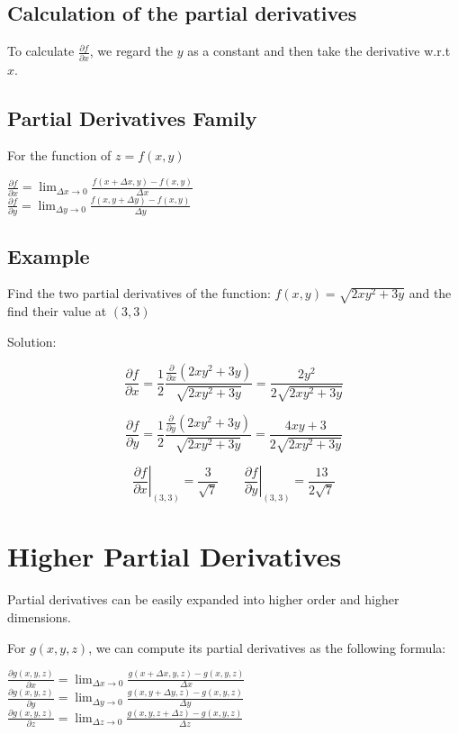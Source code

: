 \subsection{Calculation of the partial derivatives}
To calculate $\frac{\partial f}{\partial x}$, we regard the $y$ as a constant and then take the derivative w.r.t $x$.
\subsection{Partial Derivatives Family}
For the function of $z=f(x,y)$
\begin{center}
$\frac{\partial f}{\partial x}=\displaystyle\lim_{\Delta x \to 0}\frac{f(x+\Delta x,y)-f(x,y)}{\Delta x}$\\
$\frac{\partial f}{\partial y}=\displaystyle\lim_{\Delta y \to 0}\frac{f(x,y+\Delta y)-f(x,y)}{\Delta y}$
\end{center}

\subsection{Example}
Find the two partial derivatives of the function: $f(x,y)=\sqrt{2xy^2+3y}$ and the find their value at $(3,3)$

Solution:

\[\frac{\partial f}{\partial x}=\frac{1}{2}\frac{\frac{\partial}{\partial x}(2xy^2+3y)}{\sqrt{2xy^2+3y}}=\frac{2y^2}{2\sqrt{2xy^2+3y}}\]

\[\frac{\partial f}{\partial y}=\frac{1}{2}\frac{\frac{\partial}{\partial y}(2xy^2+3y)}{\sqrt{2xy^2+3y}}=\frac{4xy+3}{2\sqrt{2xy^2+3y}}\]

\[\displaystyle\left.\frac{\partial f}{\partial x}\right|_{(3,3)}=\frac{3}{\sqrt{7}}	\qquad \displaystyle\left.\frac{\partial f}{\partial y}\right|_{(3,3)}=\frac{13}{2\sqrt{7}}\]


\section{Higher Partial Derivatives}
Partial derivatives can be easily expanded into higher order and higher dimensions.

For $g(x,y,z)$, we can compute its partial derivatives as the following formula:

\begin{center}
$\frac{\partial g(x,y,z)}{\partial x}=\displaystyle\lim_{\Delta x\to 0} \frac{g(x+\Delta x,y,z)-g(x,y,z)}{\Delta x}$\\
$\frac{\partial g(x,y,z)}{\partial y}=\displaystyle\lim_{\Delta y\to 0} \frac{g(x,y+\Delta y,z)-g(x,y,z)}{\Delta y}$\\
$\frac{\partial g(x,y,z)}{\partial z}=\displaystyle\lim_{\Delta z\to 0} \frac{g(x,y,z+\Delta z)-g(x,y,z)}{\Delta z}$
\end{center}

